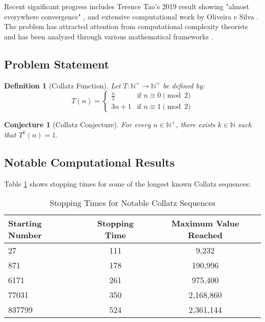 \documentclass[11pt,a4paper]{article}
\newtheorem{definition}[theorem]{Definition}
\newtheorem{conjecture}[theorem]{Conjecture}
\begin{document}
Recent significant progress includes Terence Tao's 2019 result showing "almost everywhere convergence" \cite{tao2019}, and extensive computational work by Oliveira e Silva \cite{oliveira2021}. The problem has attracted attention from computational complexity theorists \cite{crandall1978} and has been analyzed through various mathematical frameworks \cite{korec1994}.

\subsection{Problem Statement}

\begin{definition}[Collatz Function]
Let $T: \mathbb{N}^+ \rightarrow \mathbb{N}^+$ be defined by:
\begin{equation}
T(n) = \begin{cases}
\frac{n}{2} & \text{if } n \equiv 0 \pmod{2} \\
3n + 1 & \text{if } n \equiv 1 \pmod{2}
\end{cases}
\end{equation}
\end{definition}

\begin{conjecture}[Collatz Conjecture]
For every $n \in \mathbb{N}^+$, there exists $k \in \mathbb{N}$ such that $T^k(n) = 1$.
\end{conjecture}

\subsection{Notable Computational Results}

Table \ref{tab:stopping_times} shows stopping times for some of the longest known Collatz sequences:

\begin{table}[h]
\centering
\caption{Stopping Times for Notable Collatz Sequences}
\label{tab:stopping_times}
\begin{tabular}{@{}lcc@{}}
\toprule
Starting Number & Stopping Time & Maximum Value Reached \\
\midrule
27 & 111 & 9,232 \\
871 & 178 & 190,996 \\
6171 & 261 & 975,400 \\
77031 & 350 & 2,168,860 \\
837799 & 524 & 2,361,144 \\
\bottomrule
\end{tabular}
\end{table}
\end{document}
